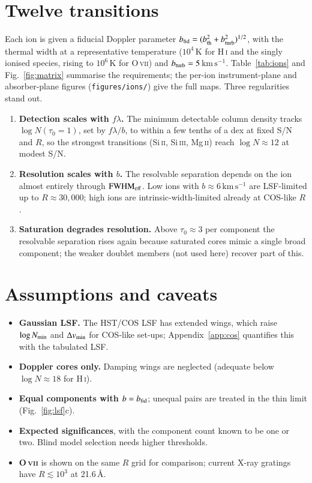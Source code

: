 \documentclass[10pt]{article}
\newcommand{\kms}{\ensuremath{\mathrm{km\,s^{-1}}}}
\newcommand{\fwhm}{\ensuremath{\mathrm{FWHM}}}
\begin{document}
\section{Twelve transitions}
Each ion is given a fiducial Doppler parameter $b_{\rm fid}=(b_{\rm th}^2+b_{\rm turb}^2)^{1/2}$, with the thermal width at a representative temperature ($10^4$\,K for H\,\textsc{i} and the singly ionised species, rising to $10^6$\,K for O\,\textsc{vii}) and $b_{\rm turb}=5$\,\kms. Table~\ref{tab:ions} and Fig.~\ref{fig:matrix} summarise the requirements; the per-ion instrument-plane and absorber-plane figures (\texttt{figures/ions/}) give the full maps. Three regularities stand out.
\begin{enumerate}
\item \textbf{Detection scales with $f\lambda$.} The minimum detectable column density tracks $\log N(\tau_0{=}1)$, set by $f\lambda/b$, to within a few tenths of a dex at fixed S/N and $R$, so the strongest transitions (Si\,\textsc{ii}, Si\,\textsc{iii}, Mg\,\textsc{ii}) reach $\log N\approx12$ at modest S/N.
\item \textbf{Resolution scales with $b$.} The resolvable separation depends on the ion almost entirely through $\fwhm_{\rm eff}$. Low ions with $b\approx6$\,\kms{} are LSF-limited up to $R\approx30{,}000$; high ions are intrinsic-width-limited already at COS-like $R$.
\item \textbf{Saturation degrades resolution.} Above $\tau_0\approx3$ per component the resolvable separation rises again because saturated cores mimic a single broad component; the weaker doublet members (not used here) recover part of this.
\end{enumerate}



\section{Assumptions and caveats}
\begin{itemize}
\item \textbf{Gaussian LSF.} The HST/COS LSF has extended wings, which raise $\log N_{\rm min}$ and $\Delta v_{\rm min}$ for COS-like set-ups; Appendix~\ref{app:cos} quantifies this with the tabulated LSF.
\item \textbf{Doppler cores only.} Damping wings are neglected (adequate below $\log N\approx18$ for H\,\textsc{i}).
\item \textbf{Equal components with $b=b_{\rm fid}$}; unequal pairs are treated in the thin limit (Fig.~\ref{fig:lsf}c).
\item \textbf{Expected significances}, with the component count known to be one or two. Blind model selection needs higher thresholds.
\item \textbf{O\,\textsc{vii}} is shown on the same $R$ grid for comparison; current X-ray gratings have $R\lesssim10^3$ at 21.6\,\AA.
\end{itemize}
\end{document}
